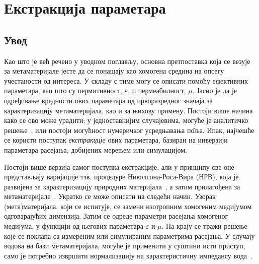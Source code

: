 \documentclass[main.tex]{subfiles}
\begin{document}





\newcommand{\sirina}{\columnwidth}
\newcommand{\sirinab}{\columnwidth}
\newcommand{\sirinac}{0.48\columnwidth}
\newcommand{\SkalaA}{0.3}
\newcommand{\SkalaB}{0.3}
\newcommand{\SkalaC}{0.3}
\newcommand{\subscript}[1]{\ensuremath{_{\textrm{#1}}}}




\newcommand{\ga}{\Gamma\Pi}

\chapter{Екстракција параметара}

\section{Увод}

Као што је већ речено у уводном поглављу, основна претпоставка која се везује за метаматеријале јесте да се понашају као хомогена средина на опсегу учестаности од интереса. У складу с тиме могу се описати помоћу ефективних параметара, као што су пермитивност, $\varepsilon$, и пермеабилност, $\mu$. Јасно је да је одређивање вредности ових параметара од прворазредног значаја за карактеризацију метаматеријала, као и за њихову примену. Постоји више начина како се ово може урадити; у једноставнијим случајевима, могуће је аналитичко решење~\cite{pendri:99}, или постоји могућност нумеричког усредњавања п\^{о}ља. Ипак, најчешће се користи поступак \emph{екстракције} ових параметара, базиран на инверзији параметара расејања, добијених мерењем или симулацијом.

Постоји више верзија самог поступка екстракције, али у принципу све оне представљају варијације тзв. процедуре Николсона-Роса-Вира (НРВ), која је развијена за карактеризацију природних материјала~\cite{Nicol:70,Weir:74}, а затим прилагођена за метаматеријале~\cite{Smith:02,Markos:03}. Укратко се може описати на следећи начин. Узорак (мета)материјала, који се испитује, се замени изотропним хомогеним медијумом одговарајућих димензија. Затим се одреде параметри расејања хомогеног медијума, у функцији од његових параметара $\varepsilon$ и $\mu$. На крају се тражи решење које се поклапа са измереним или симулираним параметрима расејања. У случају водова на бази метаматеријала, могуће је применити у суштини исти приступ, само је потребно извршити нормализацију на карактеристичну импедансу вода~\cite{Mao:05}.
\end{document}
